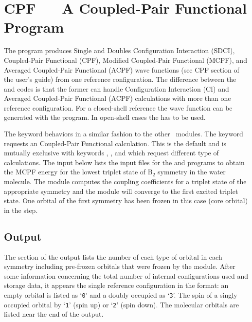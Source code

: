 \section{CPF --- A Coupled-Pair Functional Program}
\label{TUT:sec:cpf}
The  program produces  Single and Doubles Configuration
Interaction (SDCI), Coupled-Pair Functional (CPF), Modified Coupled-Pair
Functional (MCPF), and Averaged Coupled-Pair Functional (ACPF) wave
functions (see CPF section of the user's guide) from one
reference configuration. The difference between the  and
 codes is that the former can handle Configuration
Interaction (CI) and Averaged Coupled-Pair Functional (ACPF) calculations
with more than one reference configuration. For a closed-shell reference
the wave function can be generated with the  program. In 
open-shell cases the  has to be used.

The  keyword behaviors in a similar fashion to the
other \molcas\ modules.  The  keyword requests an
Coupled-Pair Functional calculation.  
This is the default and is mutually exclusive with keywords
, , and  which request different
type of calculations. The input below lists the input files
for the  and  programs to obtain the MCPF
energy for the lowest triplet state of B$_2$ symmetry in the water molecule.
The  module computes the coupling coefficients for a triplet 
state of the appropriate symmetry and the  module will
converge to the first excited triplet state. One orbital of the first
symmetry has been frozen in this case (core orbital) in the  
step.

\subsection{ Output}

The  section of the output lists the number of each type
of orbital in each symmetry including pre-frozen orbitals that were
frozen by the  module.  After some information concerning the
total number of internal configurations used and storage data, it appears
the single reference configuration in the  format: an empty
orbital is listed as `{\tt 0}' and a doubly occupied as `{\tt 3}'.  The
spin of a singly occupied orbital by `{\tt 1}' (spin up) or `{\tt 2}'
(spin down). The molecular orbitals are listed near the end of the output.

